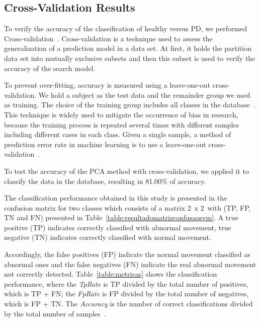 \documentclass[10pt, conference, compsocconf]{IEEEtran}
\begin{document}
\subsection{Cross-Validation Results}
To verify the accuracy of the classification of healthy versus PD, we performed Cross-validation~\cite{datamining2005}. Cross-validation is a technique used to assess the generalization of a prediction model in a data set. At first, it holds the partition data set into mutually exclusive subsets and then this subset is used to verify the accuracy of the search model.


To prevent over-fitting, accuracy is measured using a leave-one-out cross-validation. We hold a subject as the test data and the remainder group we used as training. The choice of the training group includes all classes in the database~\cite{datamining2005}. This technique is widely used to mitigate the occurrence of bias in research, because the training process is repeated several times with different samples including different cases in each class. Given a single sample, a method of prediction error rate in machine learning is to use a leave-one-out cross-validation~\cite{datamining2005}.

To test the accuracy of the PCA method with cross-validation, we applied it to classify the data in the database, resulting in 81.00$\%$ of accuracy.

The classification performance obtained in this study is presented in the confusion matrix for two classes which consists of a matrix $2$\ x $2$\, with (TP, FP, TN and FN) presented in Table~\ref{table:resultadomatrizconfusaosvm}. A true positive (TP) indicates correctly classified with abnormal movement, true negative (TN) indicates correctly classified with normal movement. 

Accordingly, the false positives (FP) indicate the normal movement classified as abnormal ones and the false negatives (FN) indicate the real abnormal movement not correctly detected. Table~\ref{table:metricas} shows the classification performance, where the \textit{TpRate} is TP divided by the total number of positives, which is TP + FN; the \textit{FpRate} is FP divided by the total number of negatives, which is FP + TN. The \textit{Accuracy} is the number of correct classifications divided by the total number of samples~\cite{datamining2005}.
\end{document}
